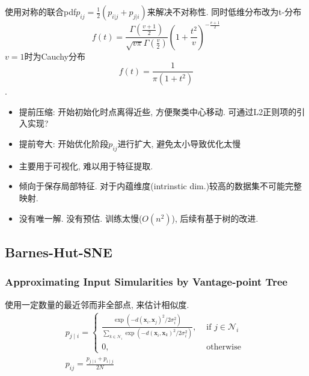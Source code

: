 \documentclass{article}
\begin{document}
使用对称的联合pdf$p_{ij}=\frac{1}{2}(p_{i|j}+p_{j|i})$来解决不对称性. 同时低维分布改为t-分布
\begin{equation}
    f(t)=\frac{\Gamma\left(\frac{v+1}{2}\right)}{\sqrt{v \pi} \Gamma\left(\frac{v}{2}\right)}\left(1+\frac{t^{2}}{v}\right)^{-\frac{v+1}{2}}
\end{equation}
$v=1$时为Cauchy分布$$f(t)=\frac{1}{\pi (1+t^2)}$$.

 \begin{itemize}
    \item 提前压缩: 开始初始化时点离得近些, 方便聚类中心移动. 可通过L2正则项的引入实现?
    \item 提前夸大: 开始优化阶段$p_{ij}$进行扩大, 避免太小导致优化太慢 
\end{itemize}

 \begin{itemize}
    \item 主要用于可视化, 难以用于特征提取.
    \item 倾向于保存局部特征. 对于内蕴维度(intrinstic dim.)较高的数据集不可能完整映射.
    \item 没有唯一解. 没有预估. 训练太慢($O(n^2)$), 后续有基于树的改进.
\end{itemize}

\subsection{Barnes-Hut-SNE}

\subsubsection{Approximating Input Simularities by Vantage-point Tree}

使用一定数量的最近邻而非全部点, 来估计相似度.
\begin{equation}
    \begin{array}{c}
    p_{j \mid i}=\left\{\begin{array}{cc}
    \frac{\exp \left(-d\left(\mathbf{x}_{i}, \mathbf{x}_{j}\right)^{2} / 2 \sigma_{i}^{2}\right)}{\sum_{k \in \mathcal{N}_{i}} \exp \left(-d\left(\mathbf{x}_{i}, \mathbf{x}_{k}\right)^{2} / 2 \sigma_{i}^{2}\right)}, & \text { if } j \in \mathcal{N}_{i} \\
    0, & \text { otherwise }
    \end{array}\right. \\
    p_{i j}=\frac{p_{j \mid i}+p_{i \mid j}}{2 N}
    \end{array}
\end{equation}
\end{document}
